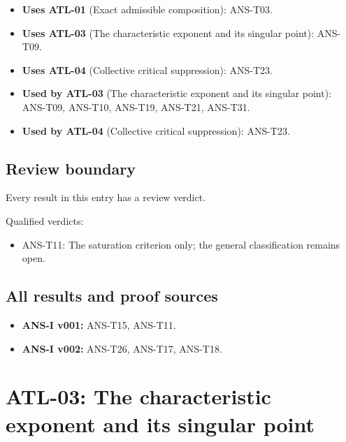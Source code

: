 \documentclass[
  11pt,
]{article}
\providecommand{\tightlist}{%
  \setlength{\itemsep}{0pt}\setlength{\parskip}{0pt}}
\begin{document}
\begin{itemize}
\tightlist
\item
  \textbf{Uses ATL-01} (Exact admissible composition): ANS-T03.
\item
  \textbf{Uses ATL-03} (The characteristic exponent and its singular
  point): ANS-T09.
\item
  \textbf{Uses ATL-04} (Collective critical suppression): ANS-T23.
\item
  \textbf{Used by ATL-03} (The characteristic exponent and its singular
  point): ANS-T09, ANS-T10, ANS-T19, ANS-T21, ANS-T31.
\item
  \textbf{Used by ATL-04} (Collective critical suppression): ANS-T23.
\end{itemize}

\hypertarget{review-boundary-1}{%
\subsection{Review boundary}\label{review-boundary-1}}

Every result in this entry has a review verdict.

Qualified verdicts:

\begin{itemize}
\tightlist
\item
  ANS-T11: The saturation criterion only; the general classification
  remains open.
\end{itemize}

\hypertarget{all-results-and-proof-sources-1}{%
\subsection{All results and proof
sources}\label{all-results-and-proof-sources-1}}

\begin{itemize}
\tightlist
\item
  \textbf{ANS-I v001:} ANS-T15, ANS-T11.
\item
  \textbf{ANS-I v002:} ANS-T26, ANS-T17, ANS-T18.
\end{itemize}

\hypertarget{atl-03-the-characteristic-exponent-and-its-singular-point}{%
\section{ATL-03: The characteristic exponent and its singular
point}\label{atl-03-the-characteristic-exponent-and-its-singular-point}}
\end{document}
